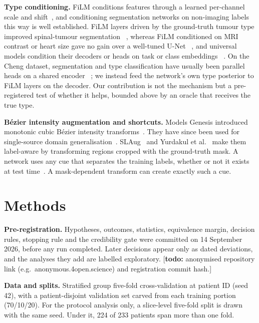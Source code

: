 \documentclass[runningheads]{llncs}
\newcommand{\todo}[1]{\textcolor{orange!80!black}{[\textbf{todo:} #1]}}
\begin{document}
\noindent\textbf{Type conditioning.}
FiLM conditions features through a learned per-channel scale and shift~\cite{perez2018}, and conditioning segmentation networks on non-imaging labels this way is well established. FiLM layers driven by the ground-truth tumour type improved spinal-tumour segmentation ~\cite{lemay2021}, whereas FiLM conditioned on MRI contrast or heart size gave no gain over a well-tuned U-Net ~\cite{vincent2020,jacenkow2019}, and universal models condition their decoders or heads on task or class embeddings ~\cite{zhang2021dodnet,liu2023clip,ye2023uniseg}. On the Cheng dataset, segmentation and type classification have usually been parallel heads on a shared encoder ~\cite{rai2024}; we instead feed the network's own type posterior to FiLM layers on the decoder. Our contribution is not the mechanism but a pre-registered test of whether it helps, bounded above by an oracle that receives the true type.

\noindent\textbf{B\'ezier intensity augmentation and shortcuts.}
Models Genesis introduced monotonic cubic B\'ezier intensity
transforms~\cite{zhou2021genesis}. They have since been used for single-source
domain generalisation~\cite{zhou2022style}. SLAug~\cite{su2023slaug} and
Yurdakul et al.~\cite{yurdakul2026} make them label-aware by transforming
regions cropped with the ground-truth mask. A network uses any cue that separates
the training labels, whether or not it exists at test time~\cite{geirhos2020}.
A mask-dependent transform can create exactly such a cue.

\section{Methods}
\label{sec:methods}

\noindent\textbf{Pre-registration.}
Hypotheses, outcomes, statistics, equivalence margin, decision rules, stopping
rule and the credibility gate were committed on 14 September 2026, before any
run completed. Later decisions appear only as dated deviations, and the analyses
they add are labelled exploratory. \todo{anonymised repository link
(e.g.\ anonymous.4open.science) and registration commit hash.}

\noindent\textbf{Data and splits.}
Stratified group five-fold cross-validation at patient ID (seed 42), with a
patient-disjoint validation set carved from each training portion (70/10/20).
For the protocol analysis only, a slice-level five-fold split is drawn with the
same seed. Under it, 224 of 233 patients span more than one fold.
\end{document}

